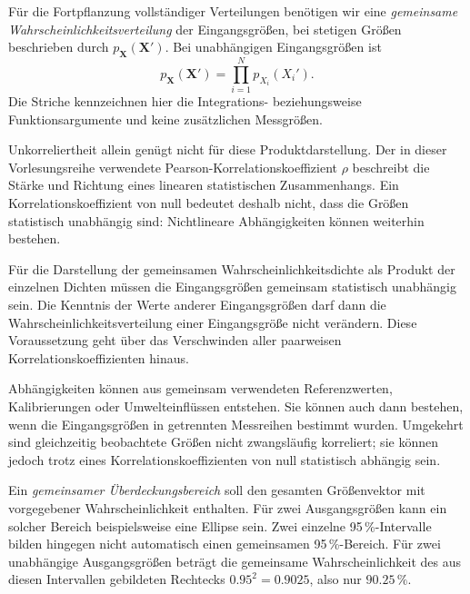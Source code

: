 Für die Fortpflanzung vollständiger Verteilungen benötigen wir eine
\textsl{gemeinsame Wahrscheinlichkeitsverteilung} der Eingangsgrößen, bei
stetigen Größen beschrieben durch $p_{\mathbf X}(\mathbf X')$.
Bei unabhängigen Eingangsgrößen ist
\begin{equation}
p_{\mathbf X}(\mathbf X')=\prod_{i=1}^N p_{X_i}(X_i').
\end{equation}
Die Striche kennzeichnen hier die Integrations- beziehungsweise
Funktionsargumente und keine zusätzlichen Messgrößen.

Unkorreliertheit allein genügt nicht für diese Produktdarstellung.
Der in dieser Vorlesungsreihe verwendete Pearson-Korre\-la\-tions\-koeffizient $\rho$ beschreibt die
Stärke und Richtung eines linearen statistischen Zusammenhangs.
Ein Korrelationskoeffizient von null bedeutet deshalb nicht, dass
die Größen statistisch unabhängig sind: Nichtlineare Abhängigkeiten
können weiterhin bestehen.

Für die Darstellung der gemeinsamen Wahrscheinlichkeitsdichte als
Produkt der einzelnen Dichten müssen die Eingangsgrößen gemeinsam
statistisch unabhängig sein. Die Kenntnis der Werte anderer
Eingangsgrößen darf dann die Wahrscheinlichkeitsverteilung einer
Eingangsgröße nicht verändern. Diese Voraussetzung geht über das
Verschwinden aller paarweisen Korrelationskoeffizienten hinaus.

Abhängigkeiten können aus gemeinsam verwendeten Referenzwerten,
Kalibrierungen oder Umwelteinflüssen entstehen. Sie können auch dann
bestehen, wenn die Eingangsgrößen in getrennten Messreihen bestimmt
wurden. Umgekehrt sind gleichzeitig beobachtete Größen nicht
zwangsläufig korreliert; sie können jedoch trotz eines
Korrelationskoeffizienten von null statistisch abhängig sein.


Ein \textsl{gemeinsamer Überdeckungsbereich} soll den gesamten Größenvektor
mit vorgegebener Wahrscheinlichkeit enthalten. Für zwei Ausgangsgrößen kann
ein solcher Bereich beispielsweise eine Ellipse sein. Zwei einzelne
95\,\%-Intervalle bilden hingegen nicht automatisch einen gemeinsamen
95\,\%-Bereich. Für zwei unabhängige Ausgangsgrößen beträgt die gemeinsame
Wahrscheinlichkeit des aus diesen Intervallen gebildeten Rechtecks
$0.95^2=0.9025$, also nur $90.25\,\%$.


